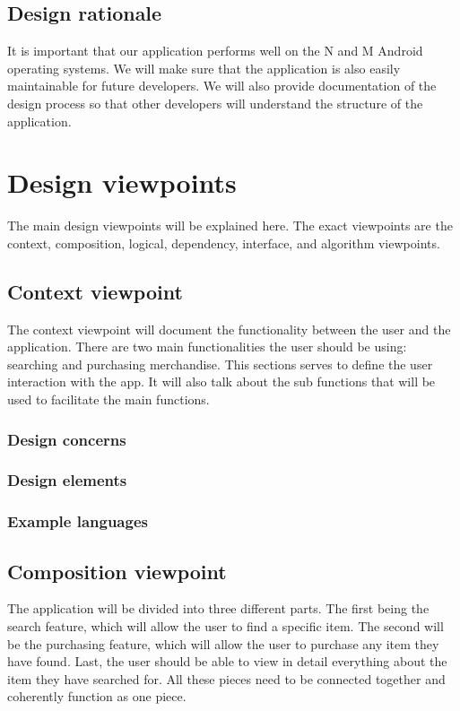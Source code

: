 \documentclass[journal,compsoc, 10pt, draftclsnofoot, onecolumn]{IEEEtran}
\begin{document}
\subsection{Design rationale}
It is important that our application performs well on the N and M Android operating 
systems. We will make sure that the application is also easily maintainable 
for future developers. We will also provide documentation of the design process 
so that other developers will understand the structure of the application.


\section{Design viewpoints}
The main design viewpoints will be explained here. The exact viewpoints are the 
context, composition, logical, dependency, interface, and algorithm viewpoints.

\subsection{Context viewpoint}
The context viewpoint will document the functionality between the user and the 
application. There are two main functionalities the user should be using: 
searching and purchasing merchandise. This sections serves to define the user 
interaction with the app. It will also talk about the sub functions that will 
be used to facilitate the main functions.

\subsubsection*{Design concerns}

\subsubsection*{Design elements}

\subsubsection*{Example languages}

\subsection{Composition viewpoint}
The application will be divided into three different parts. The first being the 
search feature, which will allow the user to find a specific item. The second 
will be the purchasing feature, which will allow the user to purchase any item 
they have found. Last, the user should be able to view in detail everything 
about the item they have searched for. All these pieces need to be connected 
together and coherently function as one piece. 
\end{document}
